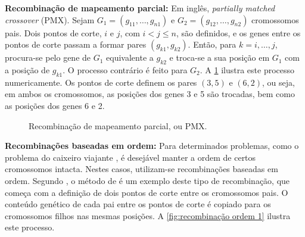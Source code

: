 \textbf{Recombinação de mapeamento parcial:} Em inglês, \emph{partially matched crossover} (PMX). Sejam $G_1 = (g_{11}, \dots, g_{n1})$ e $G_2 = (g_{12}, \dots, g_{n2})$ cromossomos pais. Dois pontos de corte, $i$ e $j$, com $i < j \leq n$, são definidos, e os genes entre os pontos de corte passam a formar pares $(g_{k1}, g_{k2})$. Então, para $k = i, \dots, j$, procura-se pelo gene de $G_1$ equivalente a $g_{k2}$ e troca-se a sua posição em $G_1$ com a posição de $g_{k1}$. O processo contrário é feito para $G_2$. A \cref{fig:PMX} ilustra este processo numericamente. Os pontos de corte definem os pares $(3, 5)$ e $(6, 2)$, ou seja, em ambos os cromossomos, as posições dos genes 3 e 5 são trocadas, bem como as posições dos genes 6 e 2.

\begin{figure}[ht]
    \centering
    \caption{Recombinação de mapeamento parcial, ou PMX.}
    \label{fig:PMX}
\end{figure}

\textbf{Recombinações baseadas em ordem:} Para determinados problemas, como o problema do caixeiro viajante \cite{SAIYED2012}, é desejável manter a ordem de certos cromossomos intacta. Nestes casos, utilizam-se recombinações baseadas em ordem. Segundo \textcite{SASTRY2005}, o método de \textcite{DAVIS1985} é um exemplo deste tipo de recombinação, que começa com a definição de dois pontos de corte entre os cromossomos pais. O conteúdo genético de cada pai entre os pontos de corte é copiado para os cromossomos filhos nas mesmas posições. A \cref{fig:recombinação ordem 1} ilustra este processo.

